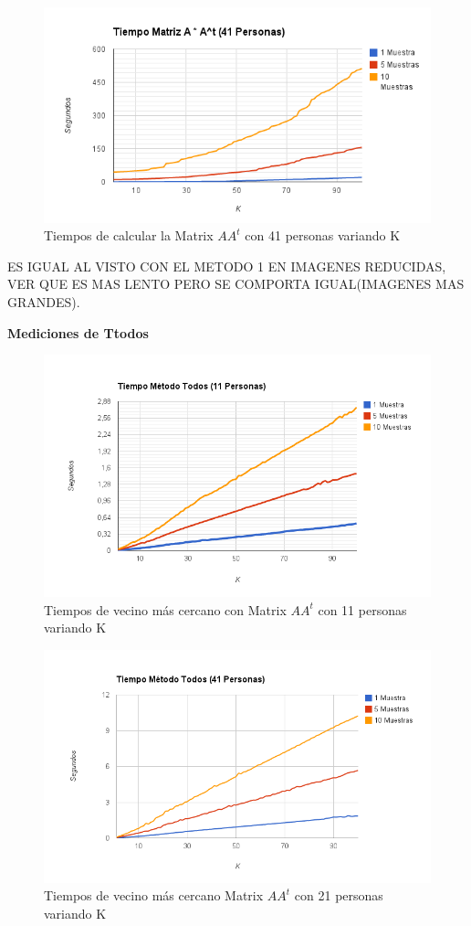 \begin{figure}[H]
\includegraphics[width=1\textwidth]{img/imagef3.png}
     \caption{Tiempos de calcular la Matrix $AA^t$ con 41 personas variando K}
\end{figure}

ES IGUAL AL VISTO CON EL METODO 1 EN IMAGENES REDUCIDAS, VER QUE ES MAS LENTO PERO SE COMPORTA IGUAL(IMAGENES MAS GRANDES).

\textbf{Mediciones de Ttodos }

\begin{figure}[H]
\includegraphics[width=1\textwidth]{img/imagef4.png}
     \caption{Tiempos de vecino más cercano con Matrix $AA^t$ con 11 personas variando K}
\end{figure}

\begin{figure}[H]
\includegraphics[width=1\textwidth]{img/imagef5.png}
     \caption{Tiempos de vecino más cercano Matrix $AA^t$ con 21 personas variando K}
\end{figure}

